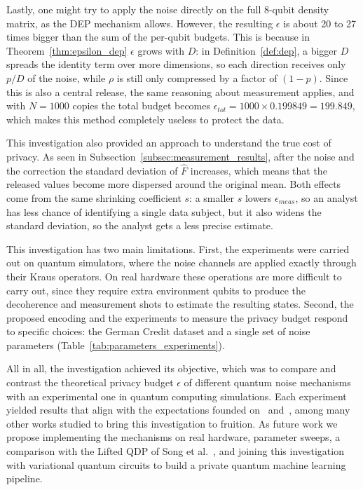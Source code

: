 \documentclass{ieeeaccess}
\begin{document}
Lastly, one might try to apply the noise directly on the full 8-qubit density matrix, as the DEP mechanism allows. However, the resulting $\epsilon$ is about 20 to 27 times bigger than the sum of the per-qubit budgets. This is because in Theorem~\ref{thm:epsilon_dep} $\epsilon$ grows with $D$: in Definition~\ref{def:dep}, a bigger $D$ spreads the identity term over more dimensions, so each direction receives only $p/D$ of the noise, while $\rho$ is still only compressed by a factor of $(1-p)$. Since this is also a central release, the same reasoning about measurement applies, and with $N = 1000$ copies the total budget becomes $\epsilon_{tot} = 1000 \times 0.199849 = 199.849$, which makes this method completely useless to protect the data.

This investigation also provided an approach to understand the true cost of privacy. As seen in Subsection~\ref{subsec:measurement_results}, after the noise and the correction the standard deviation of $\hat{F}$ increases, which means that the released values become more dispersed around the original mean. Both effects come from the same shrinking coefficient $s$: a smaller $s$ lowers $\epsilon_{meas}$, so an analyst has less chance of identifying a single data subject, but it also widens the standard deviation, so the analyst gets a less precise estimate.

This investigation has two main limitations. First, the experiments were carried out on quantum simulators, where the noise channels are applied exactly through their Kraus operators. On real hardware these operations are more difficult to carry out, since they require extra environment qubits to produce the decoherence and measurement shots to estimate the resulting states. Second, the proposed encoding and the experiments to measure the privacy budget respond to specific choices: the German Credit dataset and a single set of noise parameters (Table~\ref{tab:parameters_experiments}).

All in all, the investigation achieved its objective, which was to compare and contrast the theoretical privacy budget $\epsilon$ of different quantum noise mechanisms with an experimental one in quantum computing simulations. Each experiment yielded results that align with the expectations founded on~\cite{zhou2017differential} and~\cite{dwork2014algorithmic}, among many other works studied to bring this investigation to fruition. As future work we propose implementing the mechanisms on real hardware, parameter sweeps, a comparison with the Lifted QDP of Song et al.~\cite{song2025hybrid}, and joining this investigation with variational quantum circuits to build a private quantum machine learning pipeline.
\end{document}
